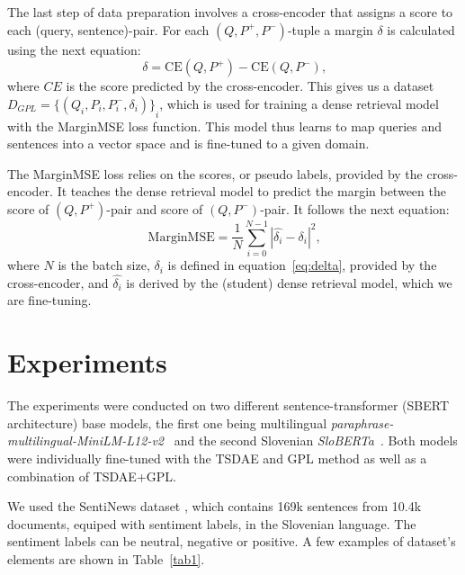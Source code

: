 \documentclass[fleqn,moreauthors,10pt]{ds_report}
\begin{document}
The last step of data preparation involves a cross-encoder that assigns a score to each (query, sentence)-pair. For each $(Q, P^{+}, P^{-})$-tuple a margin $\delta$ is calculated using the next equation:
\begin{equation}
	\delta = \text{CE}(Q, P^{+}) - \text{CE}(Q, P^{-})\text{,}
\label{eq:delta}
\end{equation}
where $CE$ is the score predicted by the cross-encoder. This gives us a dataset $D_{GPL} = {\{ ( Q_i, P_i, P_i^{-}, \delta_i ) \}}_i$, which is used for training a dense retrieval model with the MarginMSE loss function. This model thus learns to map queries and sentences into a vector space and is fine-tuned to a given domain.

The MarginMSE loss \cite{marginMSE} relies on the scores, or pseudo labels, provided by the cross-encoder. It teaches the dense retrieval model to predict the margin between the score of $(Q, P^{+})$-pair and score of $(Q, P^{-})$-pair. It follows the next equation:
\begin{equation}
	\text{MarginMSE} = \frac{1}{N} \sum_{i=0}^{N-1} |\hat{\delta_i} - \delta_i|^{2} \text{,}
\label{eq:margin}
\end{equation}
where $N$ is the batch size, $\delta_i$ is defined in equation~\ref{eq:delta}, provided by the cross-encoder, and $\hat{\delta_i}$ is derived by the (student) dense retrieval model, which we are fine-tuning.





\section*{Experiments}
The experiments were conducted on two different sentence-transformer (SBERT architecture) base models, the first one being multilingual {\it paraphrase-multilingual-MiniLM-L12-v2}~\cite{reimers-2019-sentence-bert} and the second Slovenian {\it SloBERTa}~\cite{sloberta}. Both models were individually fine-tuned with the TSDAE and GPL method as well as a combination of TSDAE+GPL.

We used the SentiNews dataset \cite{sentiNews}, which contains 169k sentences from 10.4k documents, equiped with sentiment labels, in the Slovenian language. The sentiment labels can be neutral, negative or positive. A few examples of dataset's elements are shown in Table~\ref{tab1}.
\end{document}
